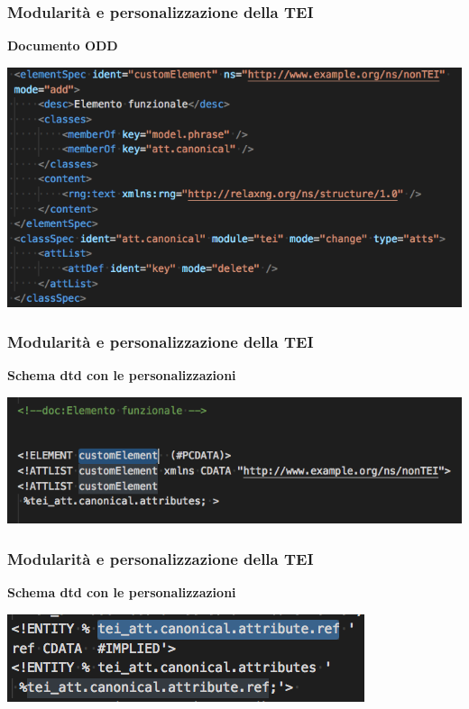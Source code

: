 \begin{frame}
    \frametitle{Modularità e personalizzazione della TEI}
    \addtocounter{nframe}{1}
    
    \textbf{Documento ODD}

     \begin{center}
        \includegraphics[width=.97\textwidth]{imgs/CustomizationODD-2.png}
     \end{center}
    
\end{frame}

\begin{frame}
    \frametitle{Modularità e personalizzazione della TEI}
    \addtocounter{nframe}{1}
    
    \textbf{Schema dtd con le personalizzazioni}

     \begin{center}
        \includegraphics[width=.97\textwidth]{imgs/TEI-Custom-DTD.png}
     \end{center}
   
    
\end{frame}

\begin{frame}
    \frametitle{Modularità e personalizzazione della TEI}
    \addtocounter{nframe}{1}
    
    \textbf{Schema dtd con le personalizzazioni}

     \begin{center}
        \includegraphics[width=.9\textwidth]{imgs/TEI-Custom-DTD-2.png}
     \end{center}
   
    
\end{frame}



